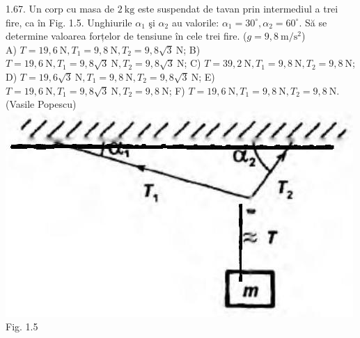 \documentclass[10pt]{article}
\begin{document}
1.67. Un corp cu masa de $2 \mathrm{~kg}$ este suspendat de tavan prin intermediul a trei fire, ca în Fig. 1.5. Unghiurile $\alpha_{1}$ şi $\alpha_{2}$ au valorile: $\alpha_{1}=30^{\circ}, \alpha_{2}=60^{\circ}$. Să se determine valoarea forțelor de tensiune în cele trei fire. ($g=9,8 \mathrm{~m} / \mathrm{s}^{2}$)\\ A) $T=19,6 \mathrm{~N}, T_{1}=9,8 \mathrm{~N}, T_{2}=9,8 \sqrt{3} \mathrm{~N}$; B) $T=19,6 \mathrm{~N}, T_{1}=9,8 \sqrt{3} \mathrm{~N}, T_{2}=9,8 \sqrt{3} \mathrm{~N}$; C) $T=39,2 \mathrm{~N}, T_{1}=9,8 \mathrm{~N}, T_{2}=9,8 \mathrm{~N}$; D) $T=19,6 \sqrt{3} \mathrm{~N}, T_{1}=9,8 \mathrm{~N}, T_{2}=9,8 \sqrt{3} \mathrm{~N}$; E) $T=19,6 \mathrm{~N}, T_{1}=9,8 \sqrt{3} \mathrm{~N}, T_{2}=9,8 \mathrm{~N}$; F) $T=19,6 \mathrm{~N}, T_{1}=9,8 \mathrm{~N}, T_{2}=9,8 \mathrm{~N}$.\\ (Vasile Popescu)\\ \includegraphics[max width=\textwidth, center]{2025_07_01_5b3ff9fa0d508c8e9f17g-017(1)} Fig. 1.5\\
\end{document}
